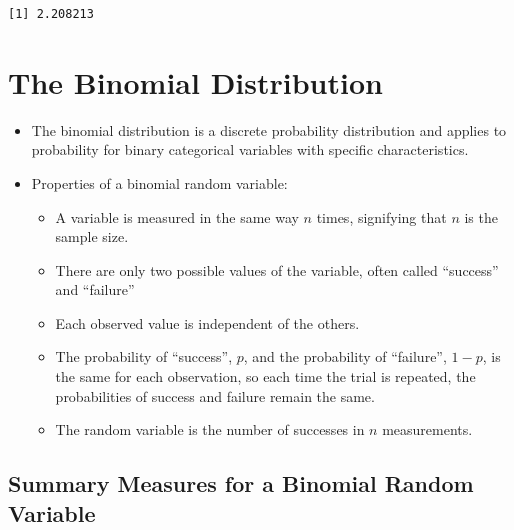\documentclass[
  letterpaper,
  DIV=11,
  numbers=noendperiod]{scrreprt}
\providecommand{\tightlist}{%
  \setlength{\itemsep}{0pt}\setlength{\parskip}{0pt}}\usepackage{longtable,booktabs,array}
\begin{document}
\begin{verbatim}
[1] 2.208213
\end{verbatim}


\chapter{The Binomial Distribution}\label{the-binomial-distribution}

\begin{itemize}
\item
  The binomial distribution is a discrete probability distribution and
  applies to probability for binary categorical variables with specific
  characteristics.
\item
  Properties of a binomial random variable:

  \begin{itemize}
  \tightlist
  \item
    A variable is measured in the same way \(n\) times, signifying that
    \(n\) is the sample size.
  \item
    There are only two possible values of the variable, often called
    ``success'' and ``failure''
  \item
    Each observed value is independent of the others.
  \item
    The probability of ``success'', \(p\), and the probability of
    ``failure'', \(1-p\), is the same for each observation, so each time
    the trial is repeated, the probabilities of success and failure
    remain the same.
  \item
    The random variable is the number of successes in \(n\)
    measurements.
  \end{itemize}
\end{itemize}

\section{Summary Measures for a Binomial Random
Variable}\label{summary-measures-for-a-binomial-random-variable}
\end{document}
